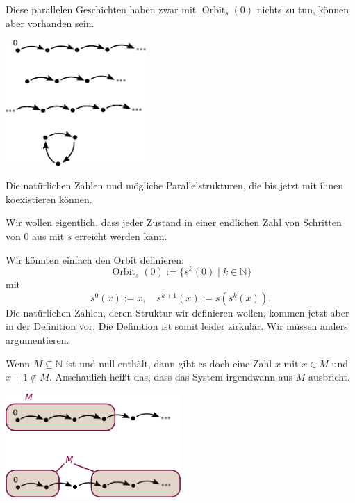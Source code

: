 \documentclass[9pt]{beamer}
\newcommand{\N}{\mathbb N}
\newcommand{\imgcaption}[1]{{\small #1}}
\begin{document}
\begin{frame}
Diese parallelen Geschichten haben zwar mit
$\operatorname{Orbit}_s(0)$ nichts zu tun, können aber vorhanden sein.
\end{frame}

\begin{frame}
\begin{center}
\includegraphics[width=0.4\textwidth]{img/Parallelstrukturen.pdf}
\end{center}
\imgcaption{Die natürlichen Zahlen und mögliche Parallelstrukturen, die bis jetzt
mit ihnen koexistieren können.}
\end{frame}

\begin{frame}
Wir wollen eigentlich, dass jeder Zustand in einer endlichen Zahl
von Schritten von $0$ aus mit $s$ erreicht werden kann.
\end{frame}

\begin{frame}
Wir könnten einfach den Orbit definieren:
\[\operatorname{Orbit}_s(0) := \{s^k(0)\mid k\in\N\}\]
mit
\[s^0(x):=x,\quad s^{k+1}(x):=s(s^k(x)).\]
Die natürlichen Zahlen, deren Struktur wir definieren wollen,
kommen jetzt aber in der Definition vor. Die Definition ist
somit leider zirkulär. Wir müssen anders argumentieren.
\end{frame}

\begin{frame}[t]
\vspace{4em}
Wenn $M\subseteq\N$ ist und null enthält, dann gibt es doch
eine Zahl $x$ mit $x\in M$ und $x+1\notin M$. Anschaulich heißt das,
dass das System irgendwann aus $M$ ausbricht.\pause

\begin{center}
\includegraphics[width=0.5\textwidth]{img/Teilmengen.pdf}
\end{center}
\end{frame}
\end{document}
